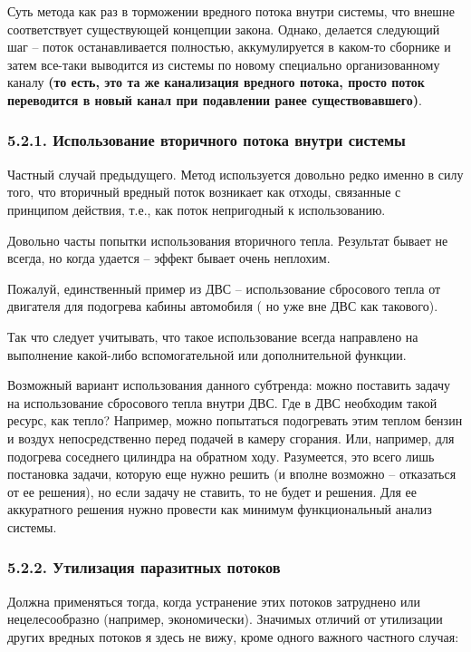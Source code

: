 \documentclass[a4paper,11pt]{article}
\begin{document}
Суть метода как раз в торможении вредного потока внутри системы, что внешне
соответствует существующей концепции закона. Однако, делается следующий шаг --
поток останавливается полностью, аккумулируется в каком-то сборнике и затем
все-таки выводится из системы по новому специально организованному каналу
\textbf{(то есть, это та же канализация вредного потока, просто поток
  переводится в новый канал при подавлении ранее существовавшего)}.

\subsubsection{5.2.1.  Использование вторичного потока внутри системы}

Частный случай предыдущего. Метод используется довольно редко именно в силу
того, что вторичный вредный поток возникает как отходы, связанные с принципом
действия, т.е., как поток непригодный к использованию.

Довольно часты попытки использования вторичного тепла. Результат бывает не
всегда, но когда удается -- эффект бывает очень неплохим.

Пожалуй, единственный пример из ДВС -- использование сбросового тепла от
двигателя для подогрева кабины автомобиля ( но уже вне ДВС как такового).

Так что следует учитывать, что такое использование всегда направлено на
выполнение какой-либо вспомогательной или дополнительной функции.

Возможный вариант использования данного субтренда: можно поставить задачу на
использование сбросового тепла внутри ДВС. Где в ДВС необходим такой ресурс,
как тепло? Например, можно попытаться подогревать этим теплом бензин и воздух
непосредственно перед подачей в камеру сгорания. Или, например, для подогрева
соседнего цилиндра на обратном ходу. Разумеется, это всего лишь постановка
задачи, которую еще нужно решить (и вполне возможно -- отказаться от ее
решения), но если задачу не ставить, то не будет и решения. Для ее аккуратного
решения нужно провести как минимум функциональный анализ системы.

\subsubsection{5.2.2. Утилизация паразитных потоков}

Должна применяться тогда, когда устранение этих потоков затруднено или
нецелесообразно (например, экономически). Значимых отличий от утилизации
других вредных потоков я здесь не вижу, кроме одного важного частного случая:
\end{document}
